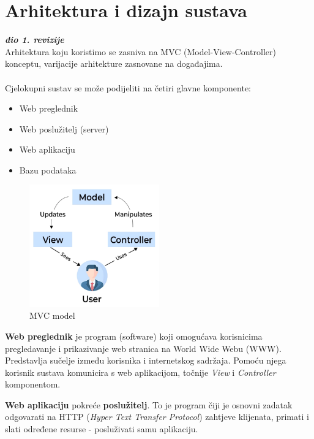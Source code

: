 \chapter{Arhitektura i dizajn sustava}
		
		\textbf{\textit{dio 1. revizije}}\\

		Arhitektura koju koristimo se zasniva na MVC (Model-View-Controller) konceptu, varijacije arhitekture zasnovane na događajima.
        \\
        \\
        Cjelokupni sustav se može podijeliti na četiri glavne komponente:
            \begin{itemize}
                \item Web preglednik
                \item Web poslužitelj (server)
                \item Web aplikaciju
                \item Bazu podataka
            \end{itemize}
    
        \begin{figure}[h]
            \centering
            \includegraphics[width=0.5\textwidth]{slike/mvc.png}
            \caption{MVC model}
            \label{fig:mesh1}
        \end{figure}
        
        \textbf{Web preglednik} je program (software) koji omogućava korisnicima pregledavanje i prikazivanje web stranica na World Wide Webu (WWW). Predstavlja sučelje između korisnika i internetskog sadržaja. Pomoću njega korisnik sustava komunicira s web aplikacijom, točnije \textit{View} i \textit{Controller} komponentom.
        
        \pagebreak

        \textbf{Web aplikaciju} pokreće \textbf{poslužitelj}. To je program čiji je osnovni zadatak odgovarati na HTTP (\textit{Hyper Text Transfer Protocol}) zahtjeve klijenata, primati i slati određene resurse - posluživati samu aplikaciju. 
        

